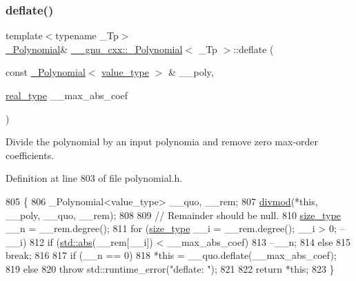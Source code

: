 \subsubsection{\texorpdfstring{deflate()}{deflate()}\hspace{0.1cm}{\footnotesize\ttfamily [2/2]}}
{\footnotesize\ttfamily template$<$typename \+\_\+\+Tp$>$ \\
\hyperlink{class____gnu__cxx_1_1__Polynomial}{\+\_\+\+Polynomial}\& \hyperlink{class____gnu__cxx_1_1__Polynomial}{\+\_\+\+\_\+gnu\+\_\+cxx\+::\+\_\+\+Polynomial}$<$ \+\_\+\+Tp $>$\+::deflate (\begin{DoxyParamCaption}\item[{const \hyperlink{class____gnu__cxx_1_1__Polynomial}{\+\_\+\+Polynomial}$<$ \hyperlink{class____gnu__cxx_1_1__Polynomial_a725563351f50e76084a7a016c06f8a53}{value\+\_\+type} $>$ \&}]{\+\_\+\+\_\+poly,  }\item[{\hyperlink{class____gnu__cxx_1_1__Polynomial_a656ceaafcb42abd626c253da3284998b}{real\+\_\+type}}]{\+\_\+\+\_\+max\+\_\+abs\+\_\+coef }\end{DoxyParamCaption})\hspace{0.3cm}{\ttfamily [inline]}}

Divide the polynomial by an input polynomia and remove zero max-\/order coefficients. 

Definition at line 803 of file polynomial.\+h.


\begin{DoxyCode}
805       \{
806         \_Polynomial<value\_type> \_\_quo, \_\_rem;
807         \hyperlink{namespace____gnu__cxx_a84c52dc7c40b8b2731425e93db52903d}{divmod}(*\textcolor{keyword}{this}, \_\_poly, \_\_quo, \_\_rem);
808 
809         \textcolor{comment}{// Remainder should be null.}
810         \hyperlink{class____gnu__cxx_1_1__Polynomial_a8b25fcfd4acaad0c5c08b649c22da28a}{size\_type} \_\_n = \_\_rem.degree();
811         \textcolor{keywordflow}{for} (\hyperlink{class____gnu__cxx_1_1__Polynomial_a8b25fcfd4acaad0c5c08b649c22da28a}{size\_type} \_\_i = \_\_rem.degree(); \_\_i > 0; --\_\_i)
812           \textcolor{keywordflow}{if} (\hyperlink{namespace____gnu__cxx_ab9eb9db3560f504f8cd25a71bcb6ead5}{std::abs}(\_\_rem[\_\_i]) < \_\_max\_abs\_coef)
813             --\_\_n;
814           \textcolor{keywordflow}{else}
815             \textcolor{keywordflow}{break};
816 
817         \textcolor{keywordflow}{if} (\_\_n == 0)
818           *\textcolor{keyword}{this} = \_\_quo.deflate(\_\_max\_abs\_coef);
819         \textcolor{keywordflow}{else}
820           \textcolor{keywordflow}{throw} std::runtime\_error(\textcolor{stringliteral}{"deflate: "});
821 
822         \textcolor{keywordflow}{return} *\textcolor{keyword}{this};
823       \}
\end{DoxyCode}
\mbox{\label{class____gnu__cxx_1_1__Polynomial_a07d9933aeeb9afbd823218ed921336cb}} 
